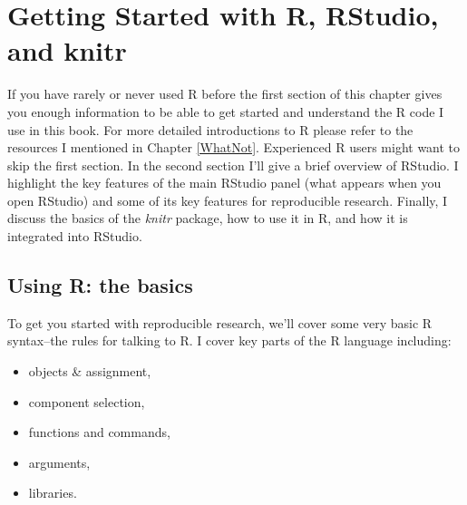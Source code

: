 



\chapter{Getting Started with R, RStudio, and knitr}\label{GettingStartedRKnitr}

If you have rarely or never used R before the first section of this chapter gives you enough information to be able to get started and understand the R code I use in this book. For more detailed introductions to R please refer to the resources I mentioned in Chapter \ref{WhatNot}. Experienced R users might want to skip the first section. In the second section I'll give a brief overview of RStudio. I highlight the key features of the main RStudio panel (what appears when you open RStudio) and some of its key features for reproducible research. Finally, I discuss the basics of the {\emph{knitr}} package, how to use it in R, and how it is integrated into RStudio.

\section{Using R: the basics}

To get you started with reproducible research, we'll cover some very basic R syntax--the rules for talking to R. I cover key parts of the R language including:

\begin{itemize}
    \item objects \& assignment,
    \item component selection,
    \item functions and commands,
    \item arguments,
    \item libraries.
\end{itemize}

